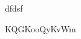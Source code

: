 
\begin{exercice}\label{exo2smath-0132}


dfdsf

\begin{center}
   
\end{center}



KQGKooQyKvWm

\end{exercice}
